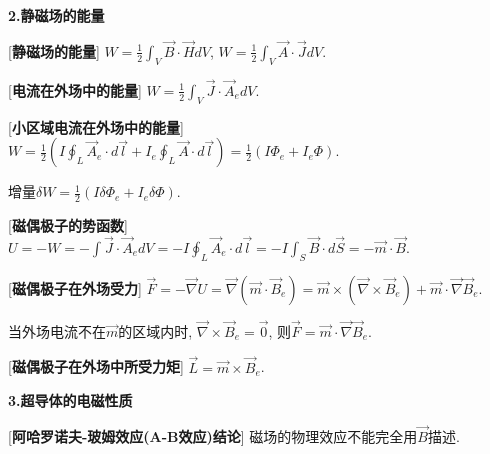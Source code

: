 \begin{center}
 \textbf{2.静磁场的能量}
\end{center}

[\textbf{静磁场的能量}] $W=\frac{1}{2}\int_V\vec B\cdot\vec HdV$, $W=\frac{1}{2}\int_V\vec A\cdot\vec JdV$.\par

[\textbf{电流在外场中的能量}] $W=\frac{1}{2}\int_V\vec J\cdot\vec A_edV$.\par

[\textbf{小区域电流在外场中的能量}] $W=\frac{1}{2}\left(I\oint_L\vec A_e\cdot d\vec l+I_e\oint_L\vec A\cdot d\vec l\right)=\frac{1}{2}\left(I\Phi_e+I_e\Phi\right)$.\par
\qquad 增量$\delta W=\frac{1}{2}\left(I\delta\Phi_e+I_e\delta\Phi\right)$.\par

[\textbf{磁偶极子的势函数}] $U=-W=-\int\vec J\cdot\vec A_edV=-I\oint_L\vec A_e\cdot d\vec l=-I\int_S\vec B\cdot d\vec S=-\vec m\cdot\vec B$.\par

[\textbf{磁偶极子在外场受力}] $\vec F=-\vec\nabla U=\vec\nabla(\vec m\cdot\vec B_e)=\vec m\times(\vec\nabla\times\vec B_e)+\vec m\cdot\vec\nabla\vec B_e$.\par
\qquad 当外场电流不在$\vec m$的区域内时, $\vec\nabla\times\vec B_e=\vec 0$, 则$\vec F=\vec m\cdot\vec \nabla\vec B_e$.\par

[\textbf{磁偶极子在外场中所受力矩}] $\vec L=\vec m\times\vec B_e$.\par

\clearpage

\begin{center}
 \textbf{3.超导体的电磁性质}
\end{center}

[\textbf{阿哈罗诺夫-玻姆效应(A-B效应)结论}] 磁场的物理效应不能完全用$\vec B$描述.

